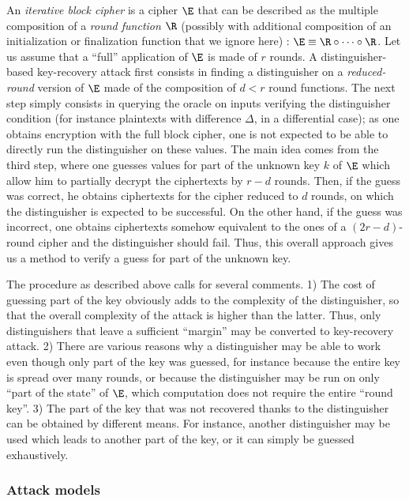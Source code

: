 An \emph{iterative block cipher} is a cipher $\E$ that can be described as the multiple composition of a \emph{round function} $\R$ (possibly with additional
composition of an initialization or finalization function that we ignore here) : $\E \equiv \R \circ \cdots \circ \R$. Let us assume that a ``full''
application of $\E$ is made of $r$ rounds. A distinguisher-based key-recovery attack first consists in finding a distinguisher on
a \emph{reduced-round} version of $\E$ made of the composition of $d < r$ round functions. The next step simply consists in querying the oracle on inputs verifying the distinguisher condition (for instance
plaintexts with difference $\Delta$, in a differential case); as one obtains encryption with the full block cipher, one is not expected to be able to directly run the distinguisher
on these values. The main idea comes from the third step, where one guesses values for part of the unknown key $k$ of $\E$ which allow him to partially decrypt the ciphertexts by $r-d$ rounds. Then, if
the guess was correct, he obtains ciphertexts for the cipher reduced to $d$ rounds, on which the distinguisher is expected to be successful. On the other hand, if the guess was incorrect, one obtains
ciphertexts somehow equivalent to the ones of a $(2r-d)$-round cipher and the distinguisher should fail. Thus, this overall approach gives us a method to verify a guess for part of the unknown key.

The procedure as described above calls for several comments. 1) The cost of guessing part of the key obviously adds to the complexity of the distinguisher, so that the overall complexity of the attack
is higher than the latter. Thus, only distinguishers that leave a sufficient ``margin'' may be converted to key-recovery attack. 2) There are various reasons why a distinguisher may be able to work
even though only part of the key was guessed, for instance because the entire key is spread over many rounds, or because the distinguisher may be run on only ``part of the state'' of $\E$, which computation
does not require the entire ``round key''. 3) The part of the key that was not recovered thanks to the distinguisher can be obtained by different means. For instance, another distinguisher may be
used which leads to another part of the key, or it can simply be guessed exhaustively.


\subsubsection{Attack models}

